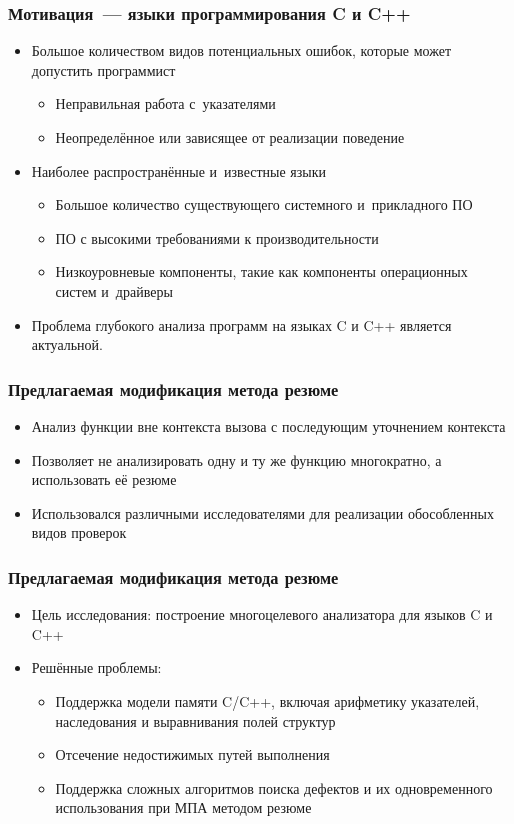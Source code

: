 \documentclass[14pt]{beamer}
\begin{document}
\begin{frame}[allowframebreaks]
\frametitle{Мотивация~--- языки программирования C и C++}
\begin{itemize}
  \item Большое количеством видов потенциальных ошибок, которые может допустить программист
  \begin{itemize}
    \item Неправильная работа с~указателями
    \item Неопределённое или зависящее от реализации поведение
  \end{itemize}
  \item Наиболее распространённые и~известные языки
    \begin{itemize}
    \item Большое количество существующего системного и~прикладного ПО
    \item ПО с высокими требованиями к производительности
    \item Низкоуровневые компоненты, такие как компоненты операционных систем и~драйверы
  \end{itemize}
  \item Проблема глубокого анализа программ на языках C и C++ является актуальной.
\end{itemize}
\end{frame}

\begin{frame}[allowframebreaks]
\frametitle{Предлагаемая модификация метода резюме}
\begin{itemize}
  \item Анализ функции вне контекста вызова с последующим уточнением контекста
  \item Позволяет не анализировать одну и ту же функцию многократно, а использовать её резюме
  \item Использовался различными исследователями для реализации обособленных видов проверок
\end{itemize}
\end{frame}

\begin{frame}[allowframebreaks]
\frametitle{Предлагаемая модификация метода резюме}
\begin{itemize}
  \item Цель исследования: построение многоцелевого анализатора для языков C и C++
  \item Решённые проблемы:
  \begin{itemize}
    \item Поддержка модели памяти C/C++, включая арифметику указателей, наследования и выравнивания полей структур
    \item Отсечение недостижимых путей выполнения
    \item Поддержка сложных алгоритмов поиска дефектов и их одновременного использования при МПА методом резюме
  \end{itemize}
\end{itemize}
\end{frame}
\end{document}
